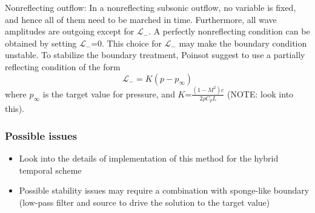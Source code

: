 Nonreflecting outflow:
In a nonreflecting subsonic outflow, no variable is fixed, and hence all of them
need to be marched in time.  Furthermore, all wave amplitudes are outgoing
except for $\mathcal{L}_-$. A perfectly nonreflecting condition can be obtained
by setting $\mathcal{L}_-$=0.  This choice for $\mathcal{L}_-$ may make the
boundary condition unstable. To stabilize the boundary treatment, Poinsot
suggest to use a partially reflecting condition of the form 
%
\begin{equation}
\mathcal{L}_- = K (p - p_\infty) 
\end{equation} 
%
where $p_\infty$ is the target value for pressure, and 
$K$=$\frac{(1-M^2)c}{2 \rho C_p L}$ (NOTE: look into this).

\subsubsection{Possible issues}
\begin{itemize}
\item Look into the details of implementation of this method for the hybrid 
temporal scheme
\item Possible stability issues may require a combination with sponge-like
boundary (low-pass filter and source to drive the solution to the target value)
\end{itemize}


